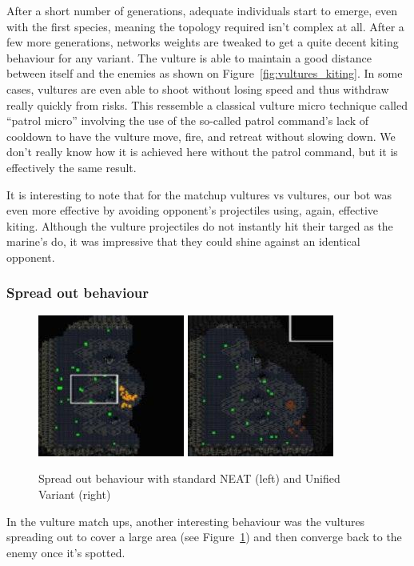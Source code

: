 After a short number of generations, adequate individuals start to
emerge, even with the first species, meaning the topology required
isn’t complex at all. After a few more generations, networks weights
are tweaked to get a quite decent kiting behaviour for any variant.
The vulture is able to maintain a good distance between itself and the
enemies as shown on Figure~\ref{fig:vultures_kiting}. In some cases,
vultures are even able to shoot without losing speed and thus withdraw
really quickly from risks. This ressemble a classical vulture micro
technique called “patrol micro” involving the use of the so-called
patrol command's lack of cooldown to have the vulture move, fire, and
retreat without slowing down. We don’t really know how it is achieved
here without the patrol command, but it is effectively the same
result.

It is interesting to note that for the matchup vultures vs vultures,
our bot was even more effective by avoiding opponent's projectiles
using, again, effective kiting. Although the vulture projectiles do
not instantly hit their targed as the marine's do, it was impressive
that they could shine against an identical opponent.

\subsubsection{Spread out behaviour}\label{subsec:spreading}

\begin{figure}
    \includegraphics[width=.22\textwidth]{figures/spreading_behaviour_standard_neat}
    \includegraphics[width=.22\textwidth]{figures/spreading_behaviour_unified}
    \caption{Spread out behaviour with standard NEAT (left) and Unified Variant (right)}\label{fig:spreading-behaviour}
\end{figure}

In the vulture match ups, another interesting behaviour was the
vultures spreading out to cover a large area (see
Figure~\ref{fig:spreading-behaviour}) and then converge back to the
enemy once it's spotted.

